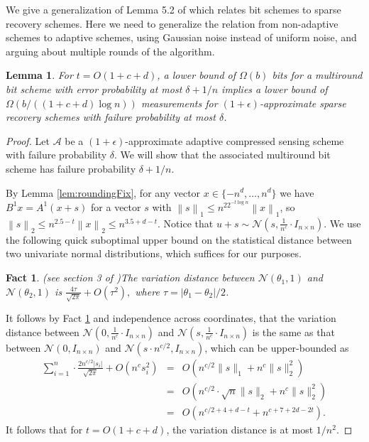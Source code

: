 \documentclass[twoside,leqno,twocolumn]{article}
\newtheorem{lemma}[theorem]{Lemma}
\newtheorem{fact}[theorem]{Fact}
\newcommand{\norm}[2]{\left \lVert#2\right \rVert_{#1}}
\def\eps{\epsilon}
\begin{document}
We give a generalization of Lemma 5.2 of \cite{PW11} which relates bit
schemes to sparse recovery schemes. Here we need to generalize the relation
from non-adaptive schemes to adaptive schemes, using Gaussian noise instead of uniform noise,
and arguing about multiple rounds of the algorithm. 

\begin{lemma}\label{lem:bits}
  For $t = O(1 + c +d)$, a lower bound of $\Omega(b)$ bits for a multiround bit scheme 
  with error probability at most $\delta+1/n$ implies a lower bound of
  $\Omega(b/((1+c+d)\log n))$ measurements for 
  $(1+\eps)$-approximate sparse recovery schemes with failure probability
  at most $\delta$.
\end{lemma}
\begin{proof}
  Let $\mathcal{A}$ be a $(1+\eps)$-approximate adaptive compressed
  sensing scheme with failure probability $\delta$. We will show that
  the associated multiround bit scheme has failure probability $\delta
  + 1/n$.


By Lemma \ref{lem:roundingFix}, for any vector $x \in \{-n^d, \ldots, n^d\}$ 
we have $B^1x = A^1(x+s)$ for a vector $s$ with
  $\norm{1}{s} \leq n^22^{-t\log n}\norm{1}{x}$, so $\norm{2}{s} \leq
  n^{2.5-t} \norm{2}{x} \leq n^{3.5+d-t}$. 
Notice that $u+s \sim \mathcal{N}(s, \frac{1}{n^c} \cdot I_{n \times n})$.
We use the following quick suboptimal upper bound on the 
statistical distance between two univariate normal
distributions, which suffices for our purposes. 
\begin{fact}(see section 3 of \cite{p05})\label{fact:gaussian}
The variation distance between $\mathcal{N}(\theta_1, 1)$ and $\mathcal{N}(\theta_2,1)$ is $\frac{4\tau}{\sqrt{2\pi}} + O(\tau^2),$
where $\tau = |\theta_1 - \theta_2|/2$. 
\end{fact}
It follows by Fact \ref{fact:gaussian} and independence across coordinates, that the variation
distance between $\mathcal{N}(0, \frac{1}{n^c} \cdot I_{n \times n})$ and 
$\mathcal{N}(s, \frac{1}{n^c} \cdot I_{n \times n})$ is the same as that between
$\mathcal{N}(0, I_{n \times n})$ and $\mathcal{N}(s \cdot n^{c/2}, I_{n \times n})$, which can be upper-bounded
as
\begin{eqnarray*}
\sum_{i=1}^n \cdot \frac{2n^{c/2} |s_i|}{\sqrt{2\pi}} + O(n^c s_i^2) & = & O(n^{c/2} \|s\|_1 + n^c \|s\|_2^2)\\ 
& = & O(n^{c/2} \cdot \sqrt{n} \|s\|_2 + n^c \|s\|_2^2)\\
 & = & O(n^{c/2 + 4+d-t} + n^{c + 7+2d-2t}).
\end{eqnarray*}
It follows that for $t = O(1 + c + d)$, the variation distance is at most $1/n^2$. 


\end{proof}
\end{document}
